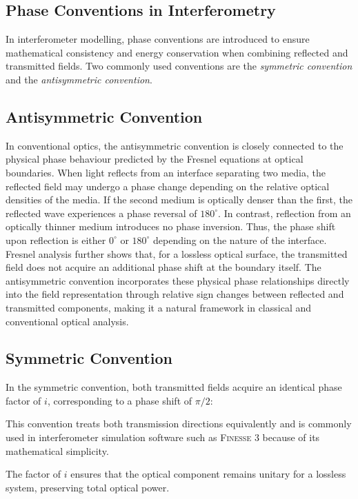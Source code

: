 \documentclass{report}
\begin{document}
\subsection{Phase Conventions in Interferometry}

In interferometer modelling, phase conventions are introduced to ensure mathematical consistency and energy conservation when combining reflected and transmitted fields. Two commonly used conventions are the \textit{symmetric convention} and the \textit{antisymmetric convention}.

\subsection{Antisymmetric Convention}

In conventional optics, the antisymmetric convention is closely connected to the physical phase behaviour predicted by the Fresnel equations at optical boundaries. When light reflects from an interface separating two media, the reflected field may undergo a phase change depending on the relative optical densities of the media. If the second medium is optically denser than the first, the reflected wave experiences a phase reversal of $180^\circ$. In contrast, reflection from an optically thinner medium introduces no phase inversion. Thus, the phase shift upon reflection is either $0^\circ$ or $180^\circ$ depending on the nature of the interface. Fresnel analysis further shows that, for a lossless optical surface, the transmitted field does not acquire an additional phase shift at the boundary itself. The antisymmetric convention incorporates these physical phase relationships directly into the field representation through relative sign changes between reflected and transmitted components, making it a natural framework in classical and conventional optical analysis.

\subsection{Symmetric Convention}

In the symmetric convention, both transmitted fields acquire an identical phase factor of $i$, corresponding to a phase shift of $\pi/2$:

This convention treats both transmission directions equivalently and is commonly used in interferometer simulation software such as \textsc{Finesse 3} because of its mathematical simplicity.

The factor of $i$ ensures that the optical component remains unitary for a lossless system, preserving total optical power.
\end{document}
